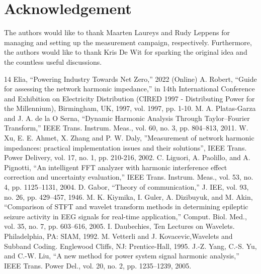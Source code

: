 \documentclass[conference]{IEEEtran}
\begin{document}









\section*{Acknowledgement}
The authors would like to thank Maarten Laureys and Rudy Leppens for managing and setting up the measurement campaign, respectively. Furthermore, the authors would like to thank Kris De Wit for sparking the original idea and the countless useful discussions.

\begin{thebibliography}{14}
 Elia, “Powering Industry Towards Net Zero,” 2022 (Online)
 A. Robert, “Guide for assessing the network harmonic impedance,” in 14th International Conference and Exhibition on Electricity Distribution (CIRED 1997 - Distributing Power for the Millennium), Birmingham, UK, 1997, vol. 1997, pp. 1-10.
 M. A. Platas-Garza and J. A. de la O Serna, “Dynamic Harmonic Analysis Through Taylor–Fourier Transform,” IEEE Trans. Instrum. Meas., vol. 60, no. 3, pp. 804–813, 2011.
 W. Xu, E. E. Ahmet, X. Zhang and P. W. Daly, ”Measurement of network harmonic impedances: practical implementation issues and their solutions”, IEEE Trans. Power Delivery, vol. 17, no. 1, pp. 210-216, 2002.
 C. Liguori, A. Paolillo, and A. Pignotti, “An intelligent FFT analyzer with harmonic interference effect correction and uncertainty evaluation,” IEEE Trans. Instrum. Meas., vol. 53, no. 4, pp. 1125–1131, 2004.
 D. Gabor, “Theory of communication,” J. IEE, vol. 93, no. 26, pp. 429–457, 1946.
 M. K. Kiymika, I. Guler, A. Dizibuyuk, and M. Akin, “Comparison of STFT and wavelet transform methods in determining epileptic seizure activity in EEG signals for real-time application,” Comput. Biol. Med., vol. 35, no. 7, pp. 603–616, 2005.
 I. Daubechies, Ten Lectures on Wavelets. Philadelphia, PA: SIAM, 1992.
 M. Vetterli and J. Kovacevic,Wavelets and Subband Coding. Englewood Cliffs, NJ: Prentice-Hall, 1995.
 J.-Z. Yang, C.-S. Yu, and C.-W. Liu, “A new method for power system signal harmonic analysis,” IEEE Trans. Power Del., vol. 20, no. 2, pp. 1235–1239, 2005.

\end{thebibliography}
\end{document}
